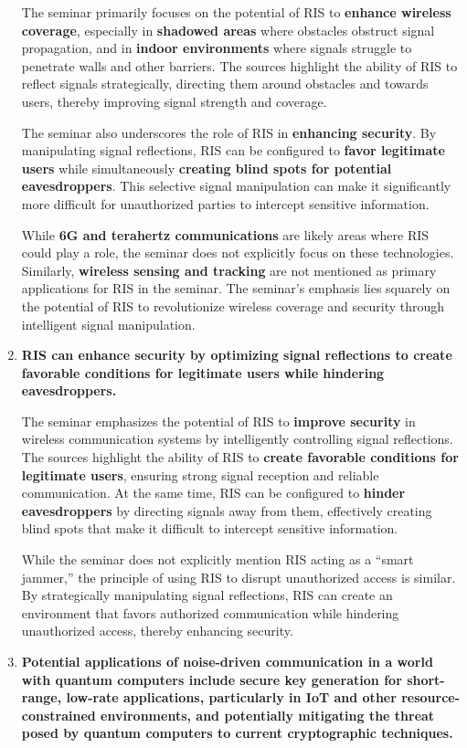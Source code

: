 \documentclass[
]{article}
\begin{document}
\begin{enumerate}
  The seminar primarily focuses on the potential of RIS to
  \textbf{enhance wireless coverage}, especially in \textbf{shadowed
  areas} where obstacles obstruct signal propagation, and in
  \textbf{indoor environments} where signals struggle to penetrate walls
  and other barriers. The sources highlight the ability of RIS to
  reflect signals strategically, directing them around obstacles and
  towards users, thereby improving signal strength and coverage.

  The seminar also underscores the role of RIS in \textbf{enhancing
  security}. By manipulating signal reflections, RIS can be configured
  to \textbf{favor legitimate users} while simultaneously
  \textbf{creating blind spots for potential eavesdroppers}. This
  selective signal manipulation can make it significantly more difficult
  for unauthorized parties to intercept sensitive information.

  While \textbf{6G and terahertz communications} are likely areas where
  RIS could play a role, the seminar does not explicitly focus on these
  technologies. Similarly, \textbf{wireless sensing and tracking} are
  not mentioned as primary applications for RIS in the seminar. The
  seminar's emphasis lies squarely on the potential of RIS to
  revolutionize wireless coverage and security through intelligent
  signal manipulation.
\item
  \textbf{RIS can enhance security by optimizing signal reflections to
  create favorable conditions for legitimate users while hindering
  eavesdroppers.}

  The seminar emphasizes the potential of RIS to \textbf{improve
  security} in wireless communication systems by intelligently
  controlling signal reflections. The sources highlight the ability of
  RIS to \textbf{create favorable conditions for legitimate users},
  ensuring strong signal reception and reliable communication. At the
  same time, RIS can be configured to \textbf{hinder eavesdroppers} by
  directing signals away from them, effectively creating blind spots
  that make it difficult to intercept sensitive information.

  While the seminar does not explicitly mention RIS acting as a ``smart
  jammer,'' the principle of using RIS to disrupt unauthorized access is
  similar. By strategically manipulating signal reflections, RIS can
  create an environment that favors authorized communication while
  hindering unauthorized access, thereby enhancing security.
\item
  \textbf{Potential applications of noise-driven communication in a
  world with quantum computers include secure key generation for
  short-range, low-rate applications, particularly in IoT and other
  resource-constrained environments, and potentially mitigating the
  threat posed by quantum computers to current cryptographic
  techniques.}


\end{enumerate}
\end{document}
